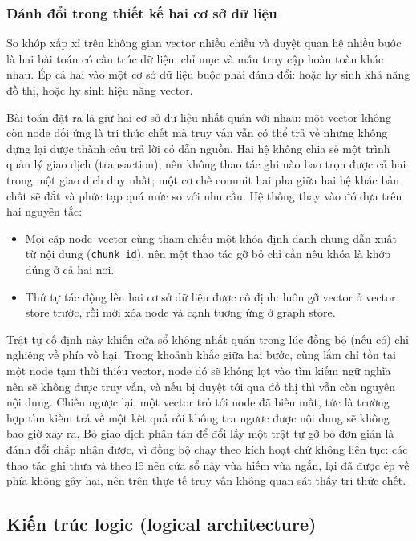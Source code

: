 \subsubsection{Đánh đổi trong thiết kế hai cơ sở dữ liệu}

So khớp xấp xỉ trên không gian vector nhiều chiều và duyệt quan hệ nhiều bước là hai bài toán có cấu trúc dữ liệu, chỉ mục và mẫu truy cập hoàn toàn khác nhau. Ép cả hai vào một cơ sở dữ liệu buộc phải đánh đổi: hoặc hy sinh khả năng đồ thị, hoặc hy sinh hiệu năng vector.

Bài toán đặt ra là giữ hai cơ sở dữ liệu nhất quán với nhau: một vector không còn node đối ứng là tri thức chết mà truy vấn vẫn có thể trả về nhưng không dựng lại được thành câu trả lời có dẫn nguồn. Hai hệ không chia sẻ một trình quản lý giao dịch (transaction), nên không thao tác ghi nào bao trọn được cả hai trong một giao dịch duy nhất; một cơ chế commit hai pha giữa hai hệ khác bản chất sẽ đắt và phức tạp quá mức so với nhu cầu. Hệ thống thay vào đó dựa trên hai nguyên tắc:

\begin{itemize} 
  \item Mọi cặp node--vector cùng tham chiếu một khóa định danh chung dẫn xuất từ nội dung (\texttt{chunk\_id}), nên một thao tác gỡ bỏ chỉ cần nêu khóa là khớp đúng ở cả hai nơi. 
  \item Thứ tự tác động lên hai cơ sở dữ liệu được cố định: luôn gỡ vector ở vector store trước, rồi mới xóa node và cạnh tương ứng ở graph store.
\end{itemize}

Trật tự cố định này khiến cửa sổ không nhất quán trong lúc đồng bộ (nếu có) chỉ nghiêng về phía vô hại. Trong khoảnh khắc giữa hai bước, cùng lắm chỉ tồn tại một node tạm thời thiếu vector, node đó sẽ không lọt vào tìm kiếm ngữ nghĩa nên sẽ không được truy vấn, và nếu bị duyệt tới qua đồ thị thì vẫn còn nguyên nội dung. Chiều ngược lại, một vector trỏ tới node đã biến mất, tức là trường hợp tìm kiếm trả về một kết quả rồi không tra ngược được nội dung sẽ không bao giờ xảy ra. Bỏ giao dịch phân tán để đổi lấy một trật tự gỡ bỏ đơn giản là đánh đổi chấp nhận được, vì đồng bộ chạy theo kích hoạt chứ không liên tục: các thao tác ghi thưa và theo lô nên cửa sổ này vừa hiếm vừa ngắn, lại đã được ép về phía không gây hại, nên trên thực tế truy vấn không quan sát thấy tri thức chết.

\subsection{Kiến trúc logic (logical architecture)}

